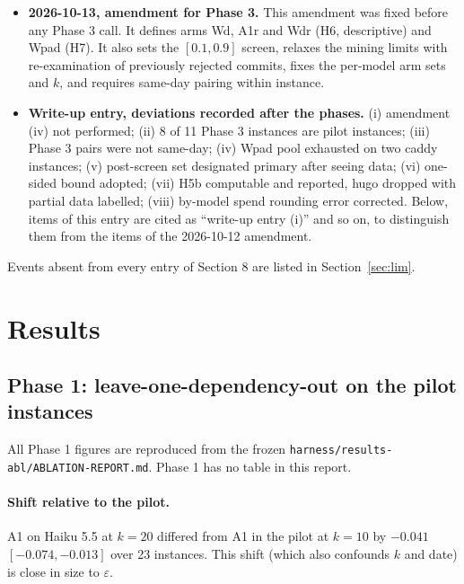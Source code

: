 \documentclass[10pt]{article}
\newcommand{\eps}{\varepsilon}
\begin{document}
\begin{itemize}
\item \textbf{2026-10-13, amendment for Phase 3.} This amendment was fixed before any Phase 3 call. It defines arms Wd, A1r and Wdr (H6, descriptive) and Wpad (H7). It also sets the $[0.1, 0.9]$ screen, relaxes the mining limits with re-examination of previously rejected commits, fixes the per-model arm sets and $k$, and requires same-day pairing within instance.
\item \textbf{Write-up entry, deviations recorded after the phases.} (i) amendment (iv) not performed; (ii) 8 of 11 Phase 3 instances are pilot instances; (iii) Phase 3 pairs were not same-day; (iv) Wpad pool exhausted on two caddy instances; (v) post-screen set designated primary after seeing data; (vi) one-sided bound adopted; (vii) H5b computable and reported, hugo dropped with partial data labelled; (viii) by-model spend rounding error corrected. Below, items of this entry are cited as ``write-up entry (i)'' and so on, to distinguish them from the items of the 2026-10-12 amendment.
\end{itemize}

Events absent from every entry of Section 8 are listed in Section~\ref{sec:lim}.

\section{Results}



\subsection{Phase 1: leave-one-dependency-out on the pilot instances}

All Phase 1 figures are reproduced from the frozen \texttt{harness/results-abl/ABLATION-REPORT.md}. Phase 1 has no table in this report.

\paragraph{Shift relative to the pilot.} A1 on Haiku 5.5 at $k=20$ differed from A1 in the pilot at $k=10$ by $-0.041$ $[-0.074, -0.013]$ over 23 instances. This shift (which also confounds $k$ and date) is close in size to $\eps$.
\end{document}
